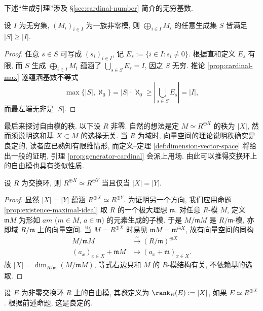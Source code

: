 下述``生成引理''涉及 \S\ref{sec:cardinal-number} 简介的无穷基数.
\begin{lemma}\label{prop:generator-cardinal}
	设 $I$ 为无穷集, $(M_i)_{i \in I}$ 为一族非零模, 则 $\bigoplus_{i \in I} M_i$ 的任意生成集 $S$ 皆满足 $|S| \geq |I|$.
\end{lemma}
\begin{proof}
	任意 $s \in S$ 可写成 $(s_i)_{i \in I}$, 记 $E_s := \{i \in I: s_i \neq 0\}$. 根据直和定义 $E_s$ 有限, 而 $S$ 生成 $\bigoplus_{i \in I} M_i$ 蕴涵了 $\bigcup_{s \in S} E_s = I$, 因之 $S$ 无穷. 推论 \ref{prop:cardinal-max} 遂蕴涵基数不等式
	\[ \max\{|S|, \aleph_0 \} = |S| \cdot \aleph_0 \geq \left| \bigcup_{s \in S} E_s \right| = |I|, \]
	而最左端无非是 $|S|$.
\end{proof}

最后来探讨自由模的秩. 以下设 $R$ 非零. 自然的想法是定 $M \simeq R^{\oplus X}$ 的秩为 $|X|$, 然而须说明这和基 $X \subset M$ 的选择无关. 当 $R$ 为域时, 向量空间的理论说明秩确实是良定的, 读者应已熟知有限维情形, 而定义--定理 \ref{def:dimension-vector-space} 将给出一般的证明, 引理 \ref{prop:generator-cardinal} 会派上用场. 由此可以推得交换环上的自由模也具有类似性质.

\begin{proposition}
	设 $R$ 为交换环, 则 $R^{\oplus X} \simeq R^{\oplus Y}$ 当且仅当 $|X|=|Y|$.
\end{proposition}
\begin{proof}
	显然 $|X|=|Y|$ 蕴涵 $R^{\oplus X} \simeq R^{\oplus Y}$. 为证明另一个方向, 我们应用命题 \ref{prop:existence-maximal-ideal} 取 $R$ 的一个极大理想 $\mathfrak{m}$. 对任意 $R$-模 $M$, 定义 $\mathfrak{m} M$ 为形如 $am$ ($m \in M$, $a \in \mathfrak{m}$) 的元素生成的子模. 于是 $M/\mathfrak{m}M$ 是 $R/\mathfrak{m}$-模, 亦即域 $R/\mathfrak{m}$ 上的向量空间. 当 $M = R^{\oplus X}$ 时易见 $\mathfrak{m}M = \mathfrak{m}^{\oplus X}$, 故有向量空间的同构
	\begin{align*}
	M/\mathfrak{m}M & \stackrel{\sim}{\longrightarrow} (R/\mathfrak{m})^{\oplus X} \\
	(a_x)_{x \in X} + \mathfrak{m}M & \longmapsto (a_x + \mathfrak{m})_{x \in X}.
	\end{align*}
	故 $|X| = \dim_{R/\mathfrak{m}} (M/\mathfrak{m}M)$, 等式右边只和 $M$ 的 $R$-模结构有关, 不依赖基的选取.
\end{proof}

\begin{definition}[自由模的秩]\label{def:rank-module}
	设 $E$ 为非零交换环 $R$ 上的自由模, 其\emph{秩}定义为 $\rank_R(E) := |X|$, 如果 $E \simeq R^{\oplus X}$. 根据前述命题, 这是良定的.
\end{definition}

